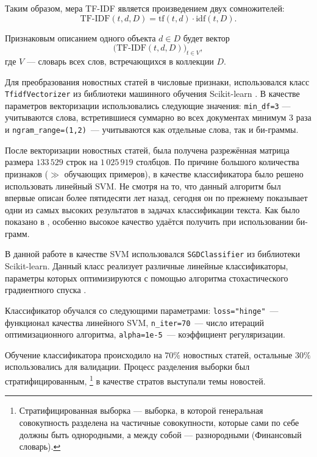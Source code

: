 \documentclass[a4paper, 14pt]{extarticle}
\begin{document}
Таким образом, мера TF-IDF является произведением двух сомножителей:
$$
\text{TF-IDF}(t, d, D) = \text{tf}(t, d) \cdot \text{idf}(t, D).
$$

Признаковым описанием одного объекта $d \in D$ будет вектор
$$
\big(\text{TF-IDF}(t,d,D)\big)_{t\in V},
$$
где $V$ --- словарь всех слов, встречающихся в коллекции $D$.

Для преобразования новостных статей в числовые признаки, использовался класс \verb+TfidfVectorizer+ из библиотеки машинного обучения Scikit-learn 
\cite{scikit-learn}. В качестве параметров векторизации использовались следующие значения: \verb+min_df=3+ --- учитываются слова, встретившиеся 
суммарно во всех документах минимум 3 раза и  \verb+ngram_range=(1,2)+~--- учитываются как отдельные слова, так и би-граммы.

После векторизации новостных статей, была получена разрежённая матрица размера $133\,529$ строк на $1\,025\,919$ столбцов. По причине большого 
количества признаков ($\gg$  обучающих примеров), в качестве классификатора было решено использовать линейный SVM. Не смотря на то, что данный 
алгоритм был впервые описан более пятидесяти лет назад, сегодня он по прежнему показывает одни из самых высоких результатов в задачах классификации 
текста. Как было показано в \cite{wang12simple}, особенно высокое качество удаётся получить при использовании би-грамм.

В данной работе в качестве SVM использовался \verb+SGDClassifier+ из библиотеки Scikit-learn. Данный класс реализует различные линейные
классификаторы, параметры которых оптимизируются с помощью алгоритма стохастического градиентного спуска \cite{Bottou2010}.

Классификатор обучался со следующими параметрами: \verb+loss="hinge"+~--- функционал качества линейного SVM,
\verb+n_iter=70+~--- число итераций оптимизационного алгоритма, \verb+alpha=1e-5+~--- коэффициент регуляризации.

Обучение классификатора происходило на $70\%$ новостных статей, остальные $30\%$ использовались для валидации.
Процесс разделения выборки был стратифицированным, \footnote{Стратифицированная выборка --- выборка, в которой генеральная совокупность разделена на 
частичные совокупности, которые сами по себе должны быть однородными, а между собой --- разнородными (Финансовый словарь).} в качестве
стратов выступали темы новостей.
\end{document}
